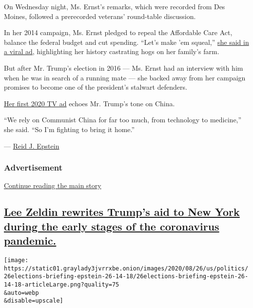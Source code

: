 On Wednesday night, Ms. Ernst's remarks, which were recorded from Des
Moines, followed a prerecorded veterans' round-table discussion.

In her 2014 campaign, Ms. Ernst pledged to repeal the Affordable Care
Act, balance the federal budget and cut spending. ``Let's make 'em
squeal,'' \href{https://www.youtube.com/watch?v=zc8uLuHsNw0}{she said in
a viral ad}, highlighting her history castrating hogs on her family's
farm.

But after Mr. Trump's election in 2016 --- Ms. Ernst had an interview
with him when he was in search of a running mate --- she backed away
from her campaign promises to become one of the president's stalwart
defenders.

\href{https://www.youtube.com/watch?v=XhVzDaU9WSs}{Her first 2020 TV ad}
echoes Mr. Trump's tone on China.

``We rely on Communist China for far too much, from technology to
medicine,'' she said. ``So I'm fighting to bring it home.''

--- \href{https://www.nytimes3xbfgragh.onion/by/reid-j-epstein}{Reid J.
Epstein}

\hypertarget{advertisement-2}{%
\subsubsection{Advertisement}\label{advertisement-2}}

\protect\hyperlink{after-dfp-ad-mid3}{Continue reading the main story}

\hypertarget{lee-zeldin-rewrites-trumps-aid-to-new-york-during-the-early-stages-of-the-coronavirus-pandemic}{%
\subsection{\texorpdfstring{\protect\hyperlink{lee-zeldin-rewrites-trumps-aid-to-new-york-during-the-early-stages-of-the-coronavirus-pandemic}{Lee
Zeldin rewrites Trump's aid to New York during the early stages of the
coronavirus
pandemic.}}{Lee Zeldin rewrites Trump's aid to New York during the early stages of the coronavirus pandemic.}}\label{lee-zeldin-rewrites-trumps-aid-to-new-york-during-the-early-stages-of-the-coronavirus-pandemic}}

\texttt{[image: https://static01.graylady3jvrrxbe.onion/images/2020/08/26/us/politics/26elections-briefing-epstein-26-14-18/26elections-briefing-epstein-26-14-18-articleLarge.png?quality=75\\\&auto=webp\\\&disable=upscale]}

